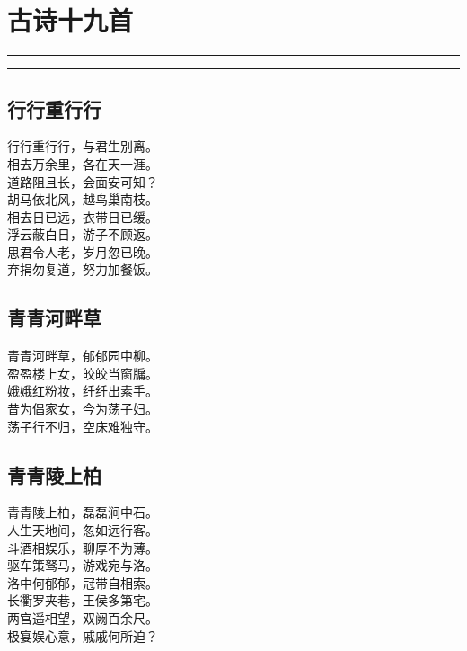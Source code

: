 \documentclass[]{article}
\date{}
\begin{document}
\hypertarget{header-n2}{%
\section{古诗十九首}\label{header-n2}}

\begin{center}\rule{0.5\linewidth}{\linethickness}\end{center}

\tableofcontents

\begin{center}\rule{0.5\linewidth}{\linethickness}\end{center}

\hypertarget{header-n6}{%
\subsection{行行重行行}\label{header-n6}}

行行重行行，与君生别离。\\
相去万余里，各在天一涯。\\
道路阻且长，会面安可知？\\
胡马依北风，越鸟巢南枝。\\
相去日已远，衣带日已缓。\\
浮云蔽白日，游子不顾返。\\
思君令人老，岁月忽已晚。\\
弃捐勿复道，努力加餐饭。

\hypertarget{header-n10}{%
\subsection{青青河畔草}\label{header-n10}}

青青河畔草，郁郁园中柳。\\
盈盈楼上女，皎皎当窗牖。\\
娥娥红粉妆，纤纤出素手。\\
昔为倡家女，今为荡子妇。\\
荡子行不归，空床难独守。

\hypertarget{header-n14}{%
\subsection{青青陵上柏}\label{header-n14}}

青青陵上柏，磊磊涧中石。\\
人生天地间，忽如远行客。\\
斗酒相娱乐，聊厚不为薄。\\
驱车策驽马，游戏宛与洛。\\
洛中何郁郁，冠带自相索。\\
长衢罗夹巷，王侯多第宅。\\
两宫遥相望，双阙百余尺。\\
极宴娱心意，戚戚何所迫？
\end{document}
